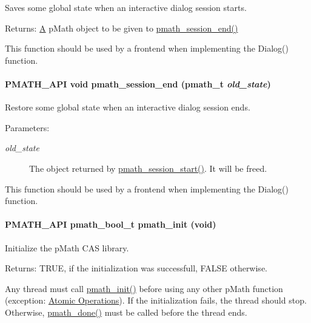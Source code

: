Saves some global state when an interactive dialog session starts. 

\begin{Desc}
\item[Returns:]\hyperlink{class_a}{A} pMath object to be given to \hyperlink{group__frontend_g13649bdb13d4f8fe693f6b72bf3a0840}{pmath\_\-session\_\-end()}\end{Desc}
This function should be used by a frontend when implementing the Dialog() function. \hypertarget{group__frontend_g13649bdb13d4f8fe693f6b72bf3a0840}{
\paragraph[{pmath\_\-session\_\-end}]{\setlength{\rightskip}{0pt plus 5cm}PMATH\_\-API void pmath\_\-session\_\-end ({\bf pmath\_\-t} {\em old\_\-state})}\hfill}
\label{group__frontend_g13649bdb13d4f8fe693f6b72bf3a0840}


Restore some global state when an interactive dialog session ends. 

\begin{Desc}
\item[Parameters:]
\begin{description}
\item[{\em old\_\-state}]The object returned by \hyperlink{group__frontend_ge55417d3114126529937b86befd70824}{pmath\_\-session\_\-start()}. It will be freed.\end{description}
\end{Desc}
This function should be used by a frontend when implementing the Dialog() function. \hypertarget{group__frontend_gfb9f2c789bee5295c6794d16c0164943}{
\paragraph[{pmath\_\-init}]{\setlength{\rightskip}{0pt plus 5cm}PMATH\_\-API {\bf pmath\_\-bool\_\-t} pmath\_\-init (void)}\hfill}
\label{group__frontend_gfb9f2c789bee5295c6794d16c0164943}


Initialize the pMath CAS library. 

\begin{Desc}
\item[Returns:]TRUE, if the initialization was successfull, FALSE otherwise.\end{Desc}
Any thread must call \hyperlink{group__frontend_gfb9f2c789bee5295c6794d16c0164943}{pmath\_\-init()} before using any other pMath function (exception: \hyperlink{group__atomic__ops}{Atomic Operations}). If the initialization fails, the thread should stop. Otherwise, \hyperlink{group__frontend_g012705e1fd248a7cebf738bae6375dd9}{pmath\_\-done()} must be called before the thread ends.

